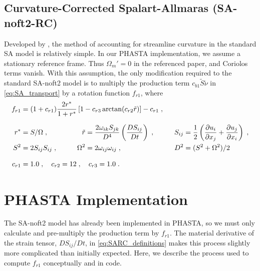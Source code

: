 \documentclass[11pt]{article}
\begin{document}
\subsection{Curvature-Corrected Spalart-Allmaras (SA-noft2-RC)}

Developed by \citet{shur2000}, the method of accounting for streamline curvature in the standard SA model is relatively simple. In our PHASTA implementation, we assume a stationary reference frame. Thus $\Omega_m' = 0$ in the referenced paper, and Coriolos terms vanish. With this assumption, the only modification required to the standard SA-noft2 model is to multiply the production term $c_{b1} \tilde{S} \tilde{\nu}$ in \eqref{eq:SA_transport} by a rotation function $f_{r1}$, where
\begin{align}
	&\begin{aligned}
		\mathllap{f_{r1}} = (1 + c_{r1}) \frac{2 r^*}{1 + r^*} \left[ 1 - c_{r3} \arctan(c_{r2} \tilde{r}) \right] - c_{r1}
		\;,
		\label{eq:SARC_rotation_function}
	\end{aligned}\\[0.25cm]
	\phantom{f_{r1}}
	&\begin{aligned}
		\mathllap{r^*} &= S / \Omega
		\;, &\qquad
		\tilde{r} &= \frac{2 \omega_{ik} S_{jk}}{D^4} \left( \frac{D S_{ij}}{D t} \right)
		\;, &\qquad
		S_{ij} &= \frac{1}{2} \left( \pp{u_i}{x_j} + \pp{u_j}{x_i} \right)
		\;, \\
		\mathllap{S^2} &= 2 S_{ij} S_{ij}
		\;, &\qquad
		\Omega^2 &= 2 \omega_{ij} \omega_{ij}
		\;, &\qquad
		D^2 &= (S^2 + \Omega^2) / 2
		\label{eq:SARC_definitions}
	\end{aligned}\\[0.25cm]
	&\begin{aligned}
		\mathllap{c_{r1}} &= 1.0
		\;, \quad
		c_{r2} = 12
		\;, \quad
		c_{r3} = 1.0
		\;.
		\label{eq:SARC_constants}
	\end{aligned}
\end{align}

\section{PHASTA Implementation} %

The SA-noft2 model has already been implemented in PHASTA, so we must only calculate and pre-multiply the production term by $f_{r1}$. The material derivative of the strain tensor, $DS_{ij}/Dt$, in \eqref{eq:SARC_definitions} makes this process slightly more complicated than initially expected. Here, we describe the process used to compute $f_{r1}$ conceptually and in code.
\end{document}
